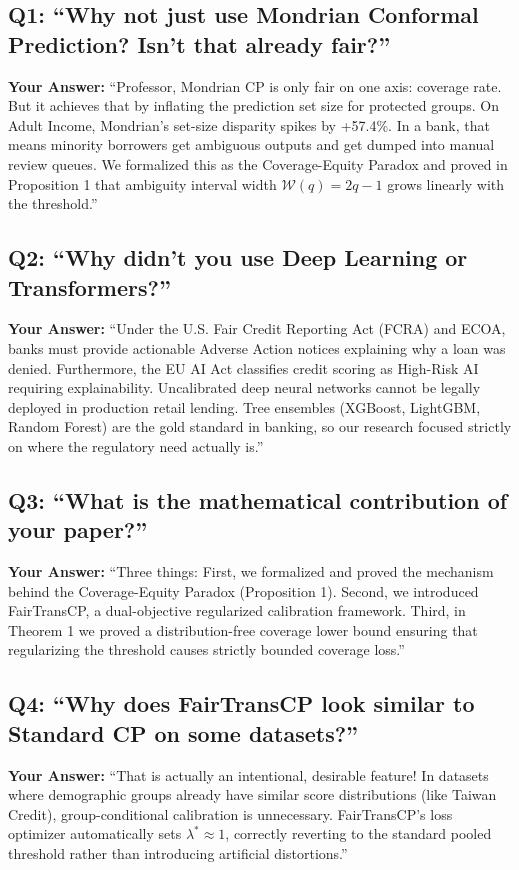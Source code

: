 \documentclass[11pt,a4paper]{article}
\begin{document}
\subsection*{Q1: ``Why not just use Mondrian Conformal Prediction? Isn't that already fair?''}
\textbf{Your Answer:}
``Professor, Mondrian CP is only fair on one axis: coverage rate. But it achieves that by inflating the prediction set size for protected groups. On Adult Income, Mondrian's set-size disparity spikes by +57.4\%. In a bank, that means minority borrowers get ambiguous outputs and get dumped into manual review queues. We formalized this as the Coverage-Equity Paradox and proved in Proposition 1 that ambiguity interval width $\mathcal{W}(q) = 2q - 1$ grows linearly with the threshold.''

\subsection*{Q2: ``Why didn't you use Deep Learning or Transformers?''}
\textbf{Your Answer:}
``Under the U.S. Fair Credit Reporting Act (FCRA) and ECOA, banks must provide actionable Adverse Action notices explaining why a loan was denied. Furthermore, the EU AI Act classifies credit scoring as High-Risk AI requiring explainability. Uncalibrated deep neural networks cannot be legally deployed in production retail lending. Tree ensembles (XGBoost, LightGBM, Random Forest) are the gold standard in banking, so our research focused strictly on where the regulatory need actually is.''

\subsection*{Q3: ``What is the mathematical contribution of your paper?''}
\textbf{Your Answer:}
``Three things: First, we formalized and proved the mechanism behind the Coverage-Equity Paradox (Proposition 1). Second, we introduced FairTransCP, a dual-objective regularized calibration framework. Third, in Theorem 1 we proved a distribution-free coverage lower bound ensuring that regularizing the threshold causes strictly bounded coverage loss.''

\subsection*{Q4: ``Why does FairTransCP look similar to Standard CP on some datasets?''}
\textbf{Your Answer:}
``That is actually an intentional, desirable feature! In datasets where demographic groups already have similar score distributions (like Taiwan Credit), group-conditional calibration is unnecessary. FairTransCP's loss optimizer automatically sets $\lambda^* \approx 1$, correctly reverting to the standard pooled threshold rather than introducing artificial distortions.''
\end{document}
